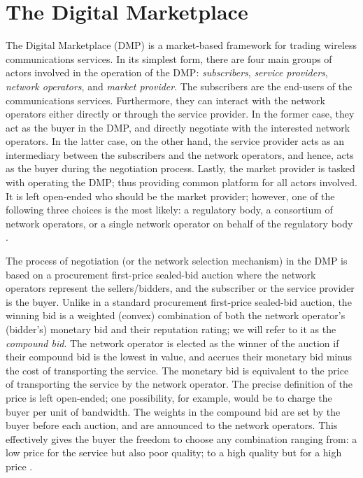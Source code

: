 \section{The Digital Marketplace} %
\label{sec:the_digital_marketplace}
The Digital Marketplace (DMP) is a market-based framework for trading wireless communications services. In its simplest form, there are four main groups of actors involved in the operation of the DMP: \emph{subscribers}, \emph{service providers}, \emph{network operators}, and \emph{market provider}. The subscribers are the end-users of the communications services. Furthermore, they can interact with the network operators either directly or through the service provider. In the former case, they act as the buyer in the DMP, and directly negotiate with the interested network operators. In the latter case, on the other hand, the service provider acts as an intermediary between the subscribers and the network operators, and hence, acts as the buyer during the negotiation process. Lastly, the market provider is tasked with operating the DMP; thus providing common platform for all actors involved. It is left open-ended who should be the market provider; however, one of the following three choices is the most likely: a regulatory body, a consortium of network operators, or a single network operator on behalf of the regulatory body \cite{DMIrvine02}.

The process of negotiation (or the network selection mechanism) in the DMP is based on a procurement first-price sealed-bid auction where the network operators represent the sellers/bidders, and the subscriber or the service provider is the buyer. Unlike in a standard procurement first-price sealed-bid auction, the winning bid is a weighted (convex) combination of both the network operator's (bidder's) monetary bid and their reputation rating; we will refer to it as the \emph{compound bid}. The network operator is elected as the winner of the auction if their compound bid is the lowest in value, and accrues their monetary bid minus the cost of transporting the service. The monetary bid is equivalent to the price of transporting the service by the network operator. The precise definition of the price is left open-ended; one possibility, for example, would be to charge the buyer per unit of bandwidth. The weights in the compound bid are set by the buyer before each auction, and are announced to the network operators. This effectively gives the buyer the freedom to choose any combination ranging from: a low price for the service but also poor quality; to a high quality but for a high price \cite{DMLeBodic00}.

